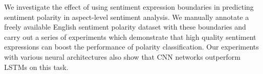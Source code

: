 We investigate the effect of using sentiment expression boundaries in predicting sentiment polarity in aspect-level sentiment analysis. We manually annotate a freely available English sentiment polarity dataset with these boundaries and carry out a series of experiments which demonstrate that high quality sentiment expressions can boost the performance of polarity classification. Our experiments with various neural architectures also show that CNN networks outperform LSTMs on this task.
